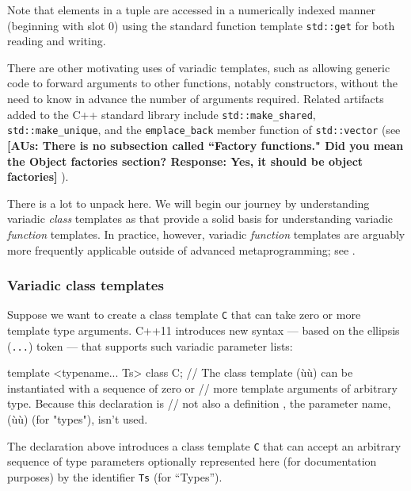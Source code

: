 \noindent Note that elements in a tuple are accessed in a numerically indexed
manner (beginning with slot 0) using the standard function template
\lstinline!std::get! for both reading and writing.

There are other motivating uses of variadic templates, such as allowing
generic code to forward arguments to other functions, notably
constructors, without the need to know in advance the number of
arguments required. Related artifacts added to the C++ standard library
include \lstinline!std::make_shared!, \lstinline!std::make_unique!, and the
\lstinline!emplace_back! member function of \lstinline!std::vector! (see
 \textbf{ [AUs: There is no subsection called ``Factory functions." Did you mean the Object factories section?  Response: Yes, it should be object factories]} ).

There is a lot to unpack here. We will begin our journey by
understanding variadic \emph{class} templates as 
that provide a solid basis for understanding variadic \emph{function}
templates. In practice, however, variadic \emph{function} templates are
arguably more frequently applicable outside of advanced metaprogramming;
see .

\subsubsection[Variadic class templates]{Variadic class templates}\label{variadic-class-templates}

Suppose we want to create a class template \lstinline!C! that can take zero
or more template type arguments. C++11 introduces new syntax --- based
on the ellipsis (\lstinline!...!) token --- that supports such variadic
parameter lists:

\begin{emcppslisting}
template <typename... Ts> class C;
    // The class template (ù{}ù) can be instantiated with a sequence of zero or
    // more template arguments of arbitrary type. Because this declaration is 
    // not also a definition , the parameter name, (ù{}ù) (for "types"), isn't used.
\end{emcppslisting}
    

\noindent The declaration above introduces a class template \lstinline!C! that can
accept an arbitrary sequence of type parameters optionally represented
here (for documentation purposes) by the identifier \lstinline!Ts! (for
``Types'').

